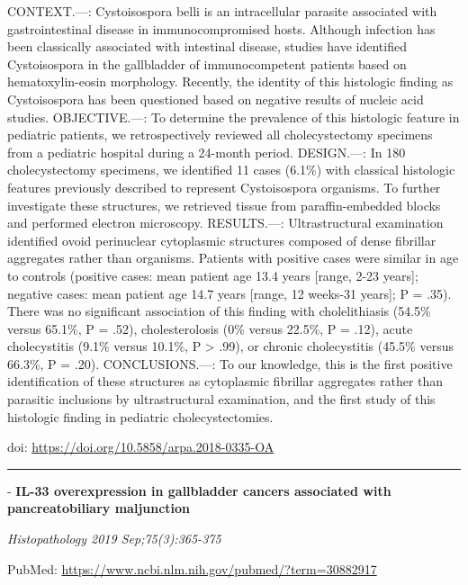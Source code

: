 \documentclass[
]{article}
\renewcommand{\linethickness}{0.05em}
\begin{document}
CONTEXT.---: Cystoisospora belli is an intracellular parasite associated
with gastrointestinal disease in immunocompromised hosts. Although
infection has been classically associated with intestinal disease,
studies have identified Cystoisospora in the gallbladder of
immunocompetent patients based on hematoxylin-eosin morphology.
Recently, the identity of this histologic finding as Cystoisospora has
been questioned based on negative results of nucleic acid studies.
OBJECTIVE.---: To determine the prevalence of this histologic feature in
pediatric patients, we retrospectively reviewed all cholecystectomy
specimens from a pediatric hospital during a 24-month period.
DESIGN.---: In 180 cholecystectomy specimens, we identified 11 cases
(6.1\%) with classical histologic features previously described to
represent Cystoisospora organisms. To further investigate these
structures, we retrieved tissue from paraffin-embedded blocks and
performed electron microscopy. RESULTS.---: Ultrastructural examination
identified ovoid perinuclear cytoplasmic structures composed of dense
fibrillar aggregates rather than organisms. Patients with positive cases
were similar in age to controls (positive cases: mean patient age 13.4
years {[}range, 2-23 years{]}; negative cases: mean patient age 14.7
years {[}range, 12 weeks-31 years{]}; P = .35). There was no significant
association of this finding with cholelithiasis (54.5\% versus 65.1\%, P
= .52), cholesterolosis (0\% versus 22.5\%, P = .12), acute
cholecystitis (9.1\% versus 10.1\%, P \textgreater{} .99), or chronic
cholecystitis (45.5\% versus 66.3\%, P = .20). CONCLUSIONS.---: To our
knowledge, this is the first positive identification of these structures
as cytoplasmic fibrillar aggregates rather than parasitic inclusions by
ultrastructural examination, and the first study of this histologic
finding in pediatric cholecystectomies.

doi: \url{https://doi.org/10.5858/arpa.2018-0335-OA}

\begin{center}\rule{0.5\linewidth}{\linethickness}\end{center}

- \textbf{IL-33 overexpression in gallbladder cancers associated with
pancreatobiliary maljunction}

\emph{Histopathology 2019 Sep;75(3):365-375}

PubMed: \url{https://www.ncbi.nlm.nih.gov/pubmed/?term=30882917}
\end{document}
